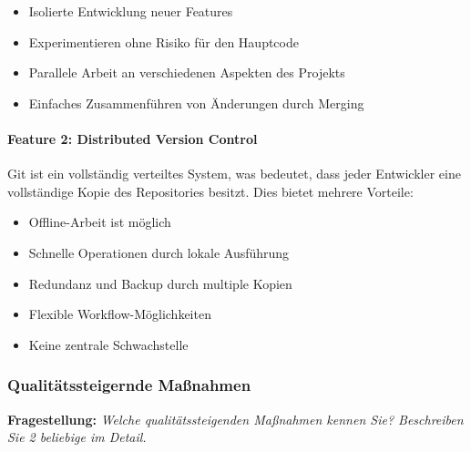     \begin{itemize}
        \item Isolierte Entwicklung neuer Features
        \item Experimentieren ohne Risiko für den Hauptcode
        \item Parallele Arbeit an verschiedenen Aspekten des Projekts
        \item Einfaches Zusammenführen von Änderungen durch Merging
    \end{itemize}

    \paragraph{Feature 2: Distributed Version Control}
    Git ist ein vollständig verteiltes System, was bedeutet, dass jeder Entwickler eine vollständige Kopie des Repositories besitzt.
    Dies bietet mehrere Vorteile:

    \begin{itemize}
        \item Offline-Arbeit ist möglich
        \item Schnelle Operationen durch lokale Ausführung
        \item Redundanz und Backup durch multiple Kopien
        \item Flexible Workflow-Möglichkeiten
        \item Keine zentrale Schwachstelle
    \end{itemize}






\subsubsection{Qualitätssteigernde Maßnahmen}

\textbf{Fragestellung:} \textit{Welche qualitätssteigenden Maßnahmen kennen Sie? Beschreiben Sie 2 beliebige im Detail.}    



